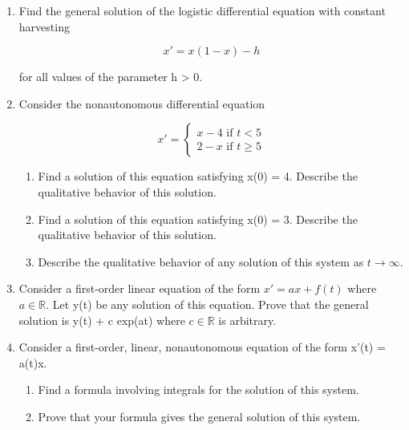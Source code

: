 \documentclass[12pt]{article}
\begin{document}
\begin{enumerate}
\[
x' = ax + \sin x
\]

where $a$ is a parameter.

\begin{enumerate}
\item Sketch the phase line when $a = 0$.
\item Use the graphs of ax and sin x to determine the qualitative behavior
of all of the bifurcations that occur as a increases from -1 to 1.
\item Sketch the bifurcation diagram for this family of differential
equations.
\end{enumerate}

\item Find the general solution of the logistic differential equation with constant harvesting

\[
x' = x(1 - x) - h
\]

for all values of the parameter h > 0.

\item Consider the nonautonomous differential equation

\[
 x'=\left\{\begin{matrix}
x-4 \text{ if } t<5 \\
2-x \text{ if } t \geq 5
\end{matrix}\right.
\]

\begin{enumerate}
\item Find a solution of this equation satisfying x(0) = 4. Describe the qualitative behavior of this solution.
\item Find a solution of this equation satisfying x(0) = 3. Describe the qualitative behavior of this solution.
\item Describe the qualitative behavior of any solution of this system as $t \to \infty$.
\end{enumerate}

\item Consider a first-order linear equation of the form $x' = ax + f(t )$ where
$a \in \mathbb{R}$. Let y(t) be any solution of this equation. Prove that the general solution is y(t) + c exp(at) where $c \in \mathbb{R}$ is arbitrary.

\item Consider a first-order, linear, nonautonomous equation of the form x'(t) = a(t)x.

\begin{enumerate}
\item Find a formula involving integrals for the solution of this system.
\item Prove that your formula gives the general solution of this system.
\end{enumerate}


\end{enumerate}
\end{document}
